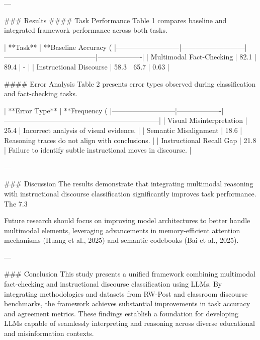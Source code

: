---

### Results
#### Task Performance
Table 1 compares baseline and integrated framework performance across both tasks.

| **Task**                  | **Baseline Accuracy (%
|---------------------------|---------------------------|---------------------------------------|-------------------|
| Multimodal Fact-Checking  | 82.1                     | 89.4                                  | -                 |
| Instructional Discourse   | 58.3                     | 65.7                                  | 0.63              |

#### Error Analysis
Table 2 presents error types observed during classification and fact-checking tasks.

| **Error Type**            | **Frequency (%
|---------------------------|-------------------|------------------------------------------------------------------|
| Visual Misinterpretation  | 25.4             | Incorrect analysis of visual evidence.                          |
| Semantic Misalignment     | 18.6             | Reasoning traces do not align with conclusions.                 |
| Instructional Recall Gap  | 21.8             | Failure to identify subtle instructional moves in discourse.    |

---

### Discussion
The results demonstrate that integrating multimodal reasoning with instructional discourse classification significantly improves task performance. The 7.3%

Future research should focus on improving model architectures to better handle multimodal elements, leveraging advancements in memory-efficient attention mechanisms (Huang et al., 2025) and semantic codebooks (Bai et al., 2025).

---

### Conclusion
This study presents a unified framework combining multimodal fact-checking and instructional discourse classification using LLMs. By integrating methodologies and datasets from RW-Post and classroom discourse benchmarks, the framework achieves substantial improvements in task accuracy and agreement metrics. These findings establish a foundation for developing LLMs capable of seamlessly interpreting and reasoning across diverse educational and misinformation contexts.

